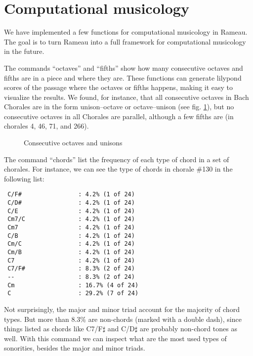 \section{Computational musicology}
\label{sec:comp-music}


We have implemented a few functions for computational musicology in
Rameau. The goal is to turn Rameau into a full framework for
computational musicology in the future.

The commands ``octaves'' and ``fifths'' show how many consecutive
octaves and fifths are in a piece and where they are. These functions
can generate lilypond scores of the passage where the octaves or
fifths happens, making it easy to visualize the results. We found, for
instance, that all consecutive octaves in Bach Chorales are in the
form unison--octave or octave--unison (see fig.
\ref{fig:oitavas-e-unissonos}), but no consecutive octaves in all
Chorales are parallel, although a few fifths are (in chorales 4, 46,
71, and 266).

\begin{figure}[!h]
  \centering
  \qquad
  \qquad
  \caption{Consecutive octaves and unisons}
  \label{fig:oitavas-e-unissonos}
\end{figure}

The command ``chords'' list the frequency of each type of chord in a
set of chorales. For instance, we can see the type of chords in
chorale \#130 in the following list:

\begin{verbatim}
 C/F#                : 4.2% (1 of 24)
 C/D#                : 4.2% (1 of 24)
 C/E                 : 4.2% (1 of 24)
 Cm7/C               : 4.2% (1 of 24)
 Cm7                 : 4.2% (1 of 24)
 C/B                 : 4.2% (1 of 24)
 Cm/C                : 4.2% (1 of 24)
 Cm/B                : 4.2% (1 of 24)
 C7                  : 4.2% (1 of 24)
 C7/F#               : 8.3% (2 of 24)
 --                  : 8.3% (2 of 24)
 Cm                  : 16.7% (4 of 24)
 C                   : 29.2% (7 of 24)
\end{verbatim}

Not surprisingly, the major and minor triad account for the majority
of chord types. But more than 8.3\% are non-chords (marked with a
double dash), since things listed as chords like C7/F$\sharp$ and
C/D$\sharp$ are probably non-chord tones as well. With this command we
can inspect what are the most used types of sonorities, besides the
major and minor triads.

